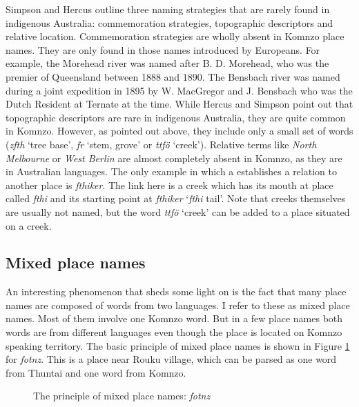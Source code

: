 Simpson and Hercus outline three naming strategies that are rarely found in indigenous Australia: commemoration strategies, topographic descriptors and relative location. Commemoration strategies are wholly absent in Komnzo place names. They are only found in those names introduced by Europeans. For example, the Morehead river was named after B. D. Morehead, who was the premier of Queensland between 1888 and 1890. The Bensbach river was named during a joint expedition in 1895 by W. MacGregor and J. Bensbach who was the Dutch Resident at Ternate at the time. While Hercus and Simpson point out that topographic descriptors are rare in indigenous Australia, they are quite common in Komnzo. However, as pointed out above, they include only a small set of words (\emph{zfth} `tree base', \emph{fr} `stem, grove' or \emph{ttfö} `creek'). Relative terms like \emph{North Melbourne} or \emph{West Berlin} are almost completely absent in Komnzo, as they are in Australian languages. The only example in which a  establishes a relation to another place is \emph{fthiker}. The link here is a creek which has its mouth at place called \emph{fthi} and its starting point at \emph{fthiker} `\emph{fthi} tail'. Note that creeks themselves are usually not named, but the word \emph{ttfö} `creek' can be added to a place situated on a creek.

\subsection{Mixed place names}\label{mixedplacenames}

An interesting phenomenon that sheds some light on  is the fact that many place names are composed of words from two languages. I refer to these as mixed place names. Most of them involve one Komnzo word. But in a few place names both words are from different languages even though the place is located on Komnzo speaking territory. The basic principle of mixed place names is shown in Figure \ref{duplaplace} for \emph{fotnz}. This is a place near Rouku village, which can be parsed as one word from  Thuntai and one word from Komnzo.

\begin{figure}[H]
\begin{center}%
\end{center}
\caption{The principle of mixed place names: \emph{fotnz}}\label{duplaplace}
\end{figure}%

